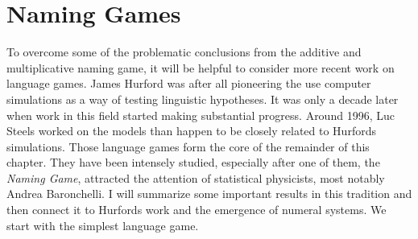 \documentclass{../src/bcthesispart}
\begin{document}
\section{Naming Games}
To overcome some of the problematic conclusions from the additive and multiplicative naming game, it will be helpful to consider more recent work on language games.
James Hurford was after all pioneering the use computer simulations as a way of testing linguistic hypotheses.
It was only a decade later when work in this field started making substantial progress.
Around 1996, Luc Steels worked on the models than happen to be closely related to Hurfords simulations.
Those language games form the core of the remainder of this chapter.
They have been intensely studied, especially after one of them, the \emph{Naming Game}, attracted the attention of statistical physicists, most notably Andrea Baronchelli.
I will summarize some important results in this tradition
and then connect it to Hurfords work and the emergence of numeral systems.
We start with the simplest language game.




\end{document}
